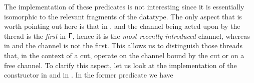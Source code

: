\begin{code}%
\>[0]\AgdaSpace{}%
%
\>[20]\AgdaSymbol{:}\AgdaSpace{}%
\AgdaSymbol{\}}\AgdaSpace{}%
\AgdaSpace{}%
\AgdaSpace{}%
\AgdaSpace{}%
\AgdaSpace{}%
\<%
\\
\>[0]\AgdaSpace{}%
%
\>[20]\AgdaSymbol{:}\AgdaSpace{}%
\AgdaSymbol{\}}\AgdaSpace{}%
\AgdaSpace{}%
\AgdaSpace{}%
\AgdaSpace{}%
\AgdaSpace{}%
\<%
\\
\>[0]\AgdaSpace{}%
%
\>[20]\AgdaSymbol{:}\AgdaSpace{}%
\AgdaSymbol{\}}\AgdaSpace{}%
\AgdaSpace{}%
\AgdaSpace{}%
\AgdaSpace{}%
\AgdaSpace{}%
\<%
\\
\>[0]\AgdaSpace{}%
%
\>[20]\AgdaSymbol{:}\AgdaSpace{}%
\AgdaSymbol{\}}\AgdaSpace{}%
\AgdaSpace{}%
\AgdaSpace{}%
\AgdaSpace{}%
\AgdaSpace{}%
\<%
\\
\>[0]\AgdaSpace{}%
%
\>[20]\AgdaSymbol{:}\AgdaSpace{}%
\AgdaSymbol{\}}\AgdaSpace{}%
\AgdaSpace{}%
\AgdaSpace{}%
\AgdaSpace{}%
\AgdaSpace{}%
\<%
\\
\>[0]\AgdaSpace{}%
%
\>[20]\AgdaSymbol{:}\AgdaSpace{}%
\AgdaSymbol{\}}\AgdaSpace{}%
\AgdaSpace{}%
\AgdaSpace{}%
\AgdaSpace{}%
\AgdaSpace{}%
\<%
\end{code}

The implementation of these predicates is not interesting since it is
essentially isomorphic to the relevant fragments of the 
datatype. The only aspect that is worth pointing out here is that in
,  and  the
channel being acted upon by the thread is the \emph{first} in $\Upgamma$, hence
it is the \emph{most recently introduced} channel, whereas in
 and  the channel is not the
first. This allows us to distinguish those threads that, in the context of a
cut, operate on the channel bound by the cut or on a free channel. To clarify
this aspect, let us look at the implementation of the constructor
 in  and in
. In the former predicate we have

